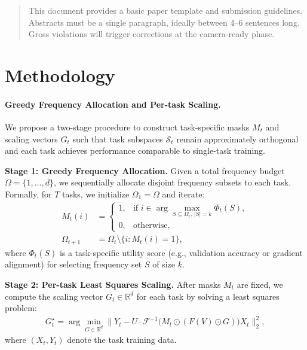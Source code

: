 \documentclass{article}
\theoremstyle{plain}
\theoremstyle{definition}
\theoremstyle{remark}
\begin{document}
\printAffiliationsAndNotice{\icmlEqualContribution} %

\begin{abstract}
This document provides a basic paper template and submission guidelines.
Abstracts must be a single paragraph, ideally between 4--6 sentences long.
Gross violations will trigger corrections at the camera-ready phase.
\end{abstract}

\section{Methodology}

\paragraph{Greedy Frequency Allocation and Per-task Scaling.} 
We propose a two-stage procedure to construct task-specific masks $M_t$ and scaling vectors $G_t$ such that task subspaces $\mathcal{S}_t$ remain approximately orthogonal and each task achieves performance comparable to single-task training.  

\textbf{Stage 1: Greedy Frequency Allocation.}  
Given a total frequency budget $\Omega = \{1, \dots, d\}$, we sequentially allocate disjoint frequency subsets to each task.  
Formally, for $T$ tasks, we initialize $\Omega_1 = \Omega$ and iterate:
\begin{align}
    M_t(i) &= 
    \begin{cases}
      1, & \text{if } i \in \arg\max_{S \subseteq \Omega_t,\, |S|=k} \Phi_t(S), \\
      0, & \text{otherwise},
    \end{cases} \\
    \Omega_{t+1} &= \Omega_t \setminus \{ i : M_t(i) = 1 \},
\end{align}
where $\Phi_t(S)$ is a task-specific utility score (e.g., validation accuracy or gradient alignment) for selecting frequency set $S$ of size $k$.  

\textbf{Stage 2: Per-task Least Squares Scaling.}  
After masks $M_t$ are fixed, we compute the scaling vector $G_t \in \mathbb{R}^d$ for each task by solving a least squares problem:
\begin{align}
    G_t^\star = \arg\min_{G \in \mathbb{R}^d} 
    \big\| Y_t - U \cdot \mathcal{F}^{-1}\!\big( M_t \odot (F(V) \odot G ) \big) X_t \big\|_2^2,
\end{align}
where $(X_t, Y_t)$ denote the task training data.  
\end{document}
